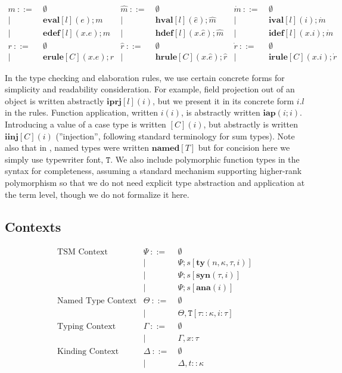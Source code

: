 \documentclass{sig-alternate}[10pt]
\newcommand{\T}{\mathtt{T}}
\begin{document}
\[\begin{array}{rlrlrl}
  m       ~::=&~ \emptyset            &\hat{m}  ~::=&~ \emptyset                &\dot{m}  ~::=&~ \emptyset\\
        | ~ &~ \mathbf{eval}[l](e);m      &     | ~ &~ \mathbf{hval}[l](\hat{e});\hat{m}    &     | ~ &~ \mathbf{ival}[l](i);\dot{m}\\
        | ~ &~ \mathbf{edef}[l](x.e);m      &     | ~ &~ \mathbf{hdef}[l](x.\hat{e});\hat{m}    &     | ~ &~ \mathbf{idef}[l](x.i);\dot{m}\\
  r       ~::=&~ \emptyset            &\hat{r}  ~::=&~ \emptyset                &\dot{r}  ~::=&~ \emptyset\\
        | ~ &~ \mathbf{erule}[C](x.e);r     &       | ~ &~ \mathbf{hrule}[C](x.\hat{e});\hat{r}   &     | ~ &~ \mathbf{irule}[C](x.i);\dot{r}
\end{array}
\]


In the type checking and elaboration rules, we use certain concrete forms for simplicity and readability consideration. For example, field projection out of an object is written abstractly $\mathbf{iprj}[l](i)$, but we present it in its concrete form $i.l$ in the rules. Function application, written $i(i)$, is abstractly written $\mathbf{iap}(i;i)$. Introducing a value of a case type is written $[C](i)$, but abstractly is written $\mathbf{iinj}[C](i)$ (''injection'', following standard terminology for sum types). Note also that in \cite{TSLs},  named types were written $\mathbf{named}[T]$ but for concision here we simply use typewriter font, $\mathtt{T}$. We also include polymorphic function types in the syntax for completeness, assuming a standard mechanism supporting higher-rank polymorphism so that we do not need explicit type abstraction and application at the term level, though we do not formalize it here.

\subsection{Contexts}
\[
\begin{array}{rrl}
\text{TSM Context}  & \Psi  ~::=&~  \emptyset\\
            &     | ~ &~  \Psi;s[\mathbf{ty}(n,\kappa,\tau,i)]\\
            &     | ~ &~  \Psi;s[\mathbf{syn}(\tau,i)]\\
            &     | ~ &~  \Psi;s[\mathbf{ana}(i)]\\
\text{Named Type Context}   & \Theta  ~::=&~ \emptyset\\
            &     | ~ &~ \Theta,\T[\tau::\kappa,i:\tau] \\
\text{Typing Context} & \Gamma  ~::=&~ \emptyset\\
            &     | ~ &~ \Gamma,x:\tau\\
\text{Kinding Context}  &   \Delta  ~::=&~ \emptyset\\
            &       | ~ &~ \Delta,t::\kappa\\
\end{array}
\]
\end{document}
